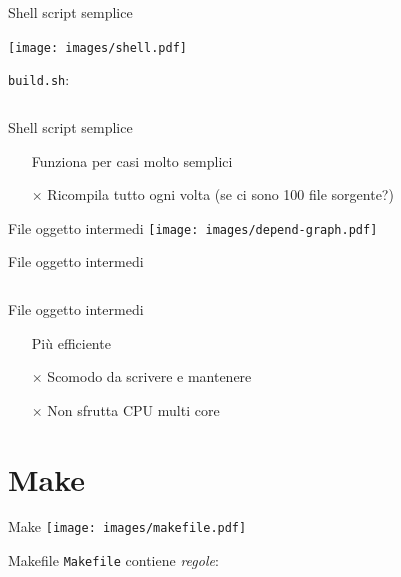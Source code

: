 \documentclass[xetex,table]{beamer}
\begin{document}
\begin{frame}[fragile]{Shell script semplice}
  \begin{center}
  \texttt{[image: images/shell.pdf]}
  \end{center}

  \texttt{build.sh}:

  \inputminted[bgcolor=codebackground,frame=single]{shell}{examples/1-shell-1/build.sh}
\end{frame}

\begin{frame}{Shell script semplice}
  \begin{itemize}
  \item[\checkmark] Funziona per casi molto semplici
  \item[$\times$]   Ricompila tutto ogni volta (se ci sono 100 file sorgente?)
  \end{itemize}
\end{frame}

\begin{frame}{File oggetto intermedi}
  \center\texttt{[image: images/depend-graph.pdf]}
\end{frame}

\begin{frame}[fragile]{File oggetto intermedi}
  \small\inputminted[bgcolor=codebackground,frame=single]{shell}{examples/1-shell-2/build.sh}
\end{frame}

\begin{frame}{File oggetto intermedi}
  \begin{itemize}
  \item[\checkmark] Più efficiente
  \item[$\times$]   Scomodo da scrivere e mantenere
  \item[$\times$]   Non sfrutta CPU multi core
  \end{itemize}
\end{frame}

\section{Make}

\begin{frame}{Make}
  \center\texttt{[image: images/makefile.pdf]}
\end{frame}

\begin{frame}{Makefile}
  \texttt{Makefile} contiene {\em regole}:

  \inputminted[bgcolor=codebackground,frame=single]{makefile}{examples/2-make-1/Makefile}
\end{frame}
\end{document}
